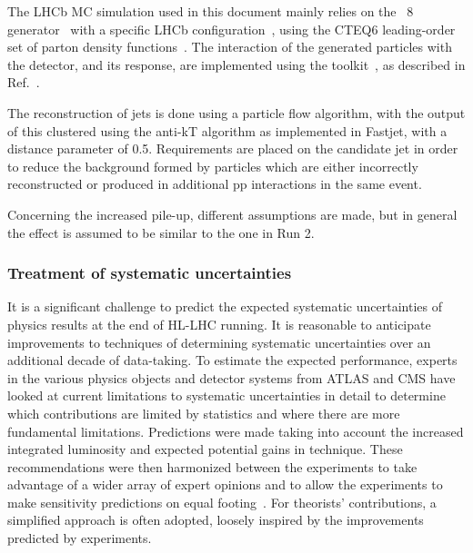 The LHCb MC simulation used in this document mainly relies on the \pythia~8 generator~\cite{Sjostrand:2007gs} with a specific LHCb configuration~\cite{LHCb-PROC-2010-056}, using the CTEQ6 leading-order set of parton density functions~\cite{cteq6}. The interaction of the generated particles with the detector, and its response, are implemented using the \geant{} toolkit~\cite{Allison:2006ve,Agostinelli:2002hh}, as described in Ref.~\cite{LHCb-PROC-2011-006}. 

The reconstruction of jets is done using a particle flow algorithm, with the output of this clustered using
the anti-kT algorithm as implemented in Fastjet, with a distance parameter of
0.5. Requirements are placed on the candidate jet in order to reduce the background
formed by particles which are either incorrectly reconstructed or produced in additional pp interactions in the same event.

Concerning the increased pile-up, different assumptions are made, but in general the effect is assumed to be similar to the one in Run 2.


\subsubsection{Treatment of systematic uncertainties}
\label{sec:methods:syst}
It is a significant challenge to predict the expected systematic uncertainties of physics results at the end of HL-LHC running.
It is reasonable to anticipate improvements to techniques of determining systematic uncertainties over an additional decade of data-taking.
To estimate the expected performance, experts in the various physics objects and detector systems from ATLAS and CMS have looked at current limitations to
systematic uncertainties in detail to determine which contributions are limited by statistics and where there are more fundamental limitations.
Predictions were made taking into account the increased integrated luminosity and expected potential gains in technique.
These recommendations were then harmonized between the experiments to take advantage of a wider array of expert opinions and to allow the experiments to make sensitivity predictions on equal footing~\cite{ATLAS_PERF_Note,CMS_PERF_Note}. For theorists' contributions, a simplified approach is often adopted, loosely inspired by the improvements predicted by experiments. 

